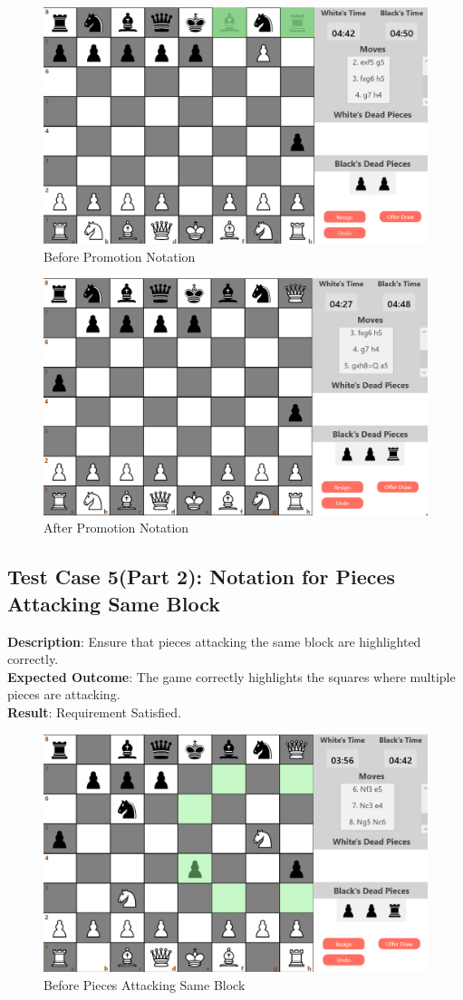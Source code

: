 \documentclass[a4paper,12pt]{article}
\begin{document}
\begin{figure}[H]
    \centering
    \includegraphics[width=0.7\linewidth]{Images/Test Cases/testCase5Part1Img1.png}
    \caption{Before Promotion Notation}
    \label{fig:BeforePromotionNotation}
\end{figure}

\begin{figure}[H]
    \centering
    \includegraphics[width=0.7\linewidth]{Images/Test Cases/testCase5Part1Img2.png}
    \caption{After Promotion Notation}
    \label{fig:AfterPromotionNotation}
\end{figure}

\subsection{Test Case 5(Part 2): Notation for Pieces Attacking Same Block}
\textbf{Description}: Ensure that pieces attacking the same block are highlighted correctly.\\
\textbf{Expected Outcome}: The game correctly highlights the squares where multiple pieces are attacking.\\
\textbf{Result}: Requirement Satisfied.

\begin{figure}[H]
    \centering
    \includegraphics[width=0.7\linewidth]{Images/Test Cases/testCase5Part2Img1.png}
    \caption{Before Pieces Attacking Same Block}
    \label{fig:BeforeAttackingSameBlock}
\end{figure}
\end{document}
